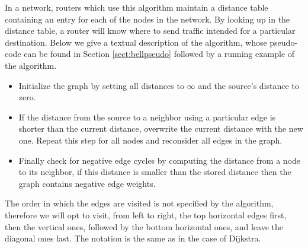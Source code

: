 In a network, routers which use this algorithm maintain a distance table containing an entry for each of the nodes in the network. By looking up in the distance table, a router will know where to send traffic intended for a particular destination. Below we give a textual description of the algorithm, whose pseudo-code can be found in Section \ref{sect:bellpseudo} followed by a running example of the algorithm.

\begin{itemize}
 \item Initialize the graph by setting all distances to $\infty$ and the source's distance to zero.
 \item If the distance from the source to a neighbor using a particular edge is shorter than the current distance, overwrite the current distance with the new one. Repeat this step for all nodes and reconsider all edges in the graph.
 \item Finally check for negative edge cycles by computing the distance from a node to its neighbor, if this distance is smaller than the stored distance then the graph contains negative edge weights.
\end{itemize}

The order in which the edges are visited is not specified by the algorithm, therefore we will opt to visit, from left to right, the top horizontal edges first, then the vertical ones, followed by the bottom horizontal ones, and leave the diagonal ones last. The notation is the same as in the case of Dijkstra. 

